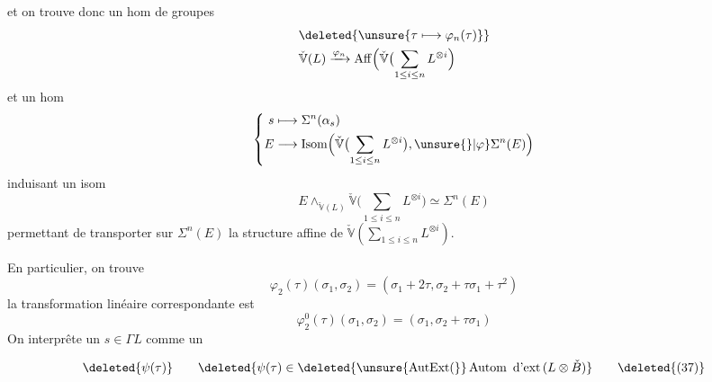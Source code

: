 et on trouve donc un hom de groupes
\[
\begin{aligned}
&\deleted{\unsure{\tau\longmapsto\varphi_n(\tau)}}\\
&\check{\mathbb V}(L)\xrightarrow{\varphi_n}\operatorname{Aff}\Bigl(\check{\mathbb V}\bigl(\sum_{1\le i\le n}L^{\otimes i}
\Bigr)
\end{aligned}
\]
et un hom
\[
\left\{\begin{aligned}
s&\longmapsto\Sigma^n(\alpha_s)\\
E&\longrightarrow\operatorname{Isom}\Bigl(\check{\mathbb V}\bigl(\sum_{1\le i\le n}L^{\otimes i}\bigr),\unsure{\}|\varphi}\Sigma^n(E)\Bigr)
\end{aligned}\right.
\]
induisant un  isom
\[
 E\mathop{\wedge}_{\check{\mathbb V}(L)}\check{\mathbb V}\bigl(\sum_{1\le i\le n}L^{\otimes i}\bigr)
 \simeq\Sigma^n(E) \tag*{(34)}
\]
permettant de transporter sur $\Sigma^n(E)$ la
structure affine de $\check{\mathbb V}(\sum_{1\le i\le n}L^{\otimes i})$.

En particulier, on trouve
\[
\varphi_2(\tau)(\sigma_1,\sigma_2)=(\sigma_1+2\tau,\sigma_2+\tau\sigma_1+\tau^2) \tag*{(35)}
\]
la transformation linéaire  correspondante est
\[
\varphi_2^0(\tau)(\sigma_1,\sigma_2)=(\sigma_1,\sigma_2+\tau\sigma_1) \tag*{(36)}
\]
On  interprête un $s\in\Gamma L$ comme un



\[
\deleted{\psi(\tau)}\qquad
\deleted{\psi(\tau)\in\deleted{\unsure{\operatorname{AutExt}(}}\operatorname{Autom}\ \text{d'ext}\,(L\otimes\check B)}
\tag*{\deleted{(37)}}
\]


